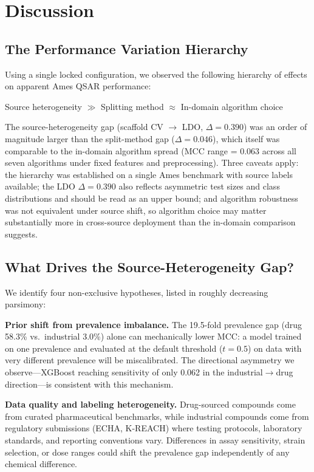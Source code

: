\section{Discussion}

\subsection{The Performance Variation Hierarchy}

Using a single locked configuration, we observed the following hierarchy of effects on apparent Ames QSAR performance:

\begin{center}
Source heterogeneity $\gg$ Splitting method $\approx$ In-domain algorithm choice
\end{center}

The source-heterogeneity gap (scaffold CV $\to$ LDO, $\Delta = 0.390$) was an order of magnitude larger than the split-method gap ($\Delta = 0.046$), which itself was comparable to the in-domain algorithm spread (MCC range = 0.063 across all seven algorithms under fixed features and preprocessing). Three caveats apply: the hierarchy was established on a single Ames benchmark with source labels available; the LDO $\Delta = 0.390$ also reflects asymmetric test sizes and class distributions and should be read as an upper bound; and algorithm robustness was not equivalent under source shift, so algorithm choice may matter substantially more in cross-source deployment than the in-domain comparison suggests.

\subsection{What Drives the Source-Heterogeneity Gap?}

We identify four non-exclusive hypotheses, listed in roughly decreasing parsimony:

\textbf{Prior shift from prevalence imbalance.} The 19.5-fold prevalence gap (drug 58.3\% vs.\ industrial 3.0\%) alone can mechanically lower MCC: a model trained on one prevalence and evaluated at the default threshold ($t = 0.5$) on data with very different prevalence will be miscalibrated. The directional asymmetry we observe---XGBoost reaching sensitivity of only 0.062 in the industrial$\to$drug direction---is consistent with this mechanism.

\textbf{Data quality and labeling heterogeneity.} Drug-sourced compounds come from curated pharmaceutical benchmarks, while industrial compounds come from regulatory submissions (ECHA, K-REACH) where testing protocols, laboratory standards, and reporting conventions vary. Differences in assay sensitivity, strain selection, or dose ranges could shift the prevalence gap independently of any chemical difference.

